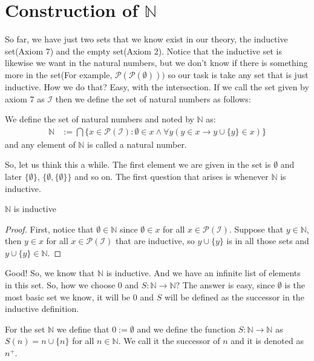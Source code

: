 \documentclass{tufte-handout}
\begin{document}
\section{Construction of $\mathbb{N}$}
So far, we have just two sets that we know exist in our theory, the inductive set(Axiom 7) and the empty set(Axiom 2). Notice that the inductive set is likewise we want in the natural numbers, but we don't know if there is something more in the set(For example, $\mathcal{P}(\mathcal{P}(\emptyset)))$ so our task is take any set that is just inductive. How we do that? Easy, with the intersection. If we call the set given by axiom 7 as $\mathcal{I}$ then we define the set of natural numbers as follows:
\begin{definition}
	We define the set of natural numbers and noted by $\mathbb{N}$ as:
	\begin{align*}
		\mathbb{N} &:= \bigcap \{x \in \mathcal{P}(\mathcal{I}): \emptyset \in x \wedge \forall y(y \in x \rightarrow y \cup \{y\} \in x)\}
	\end{align*}
	and any element of $\mathbb{N}$ is called a natural number.
\end{definition}

So, let us think this a while. The first element we are given in the set is $\emptyset$ and later $\{\emptyset\}$, $\{\emptyset, \{\emptyset\}\}$ and so on. The first question that arises is whenever $\mathbb{N}$ is inductive.
\begin{theorem}
	$\mathbb{N}$ is inductive
\end{theorem}
\begin{proof}
	First, notice that $\emptyset \in \mathbb{N}$ since $\emptyset \in x$ for all $x \in \mathcal{P}(\mathcal{I})$. Suppose that $y \in \mathbb{N}$, then $y \in x$ for all $x \in \mathcal{P}(\mathcal{I})$ that are inductive, so $y \cup \{y\}$ is in all those sets and $y \cup \{y\} \in \mathbb{N}$.
\end{proof}

Good! So, we know that $\mathbb{N}$ is inductive. And we have an infinite list of elements in this set. So, how we choose $0$ and $S: \mathbb{N} \to \mathbb{N}$? The answer is easy, since $\emptyset$ is the most basic set we know, it will be $0$ and $S$ will be defined as the successor in the inductive definition.
\begin{definition}
	For the set $\mathbb{N}$ we define that $0 := \emptyset$ and we define the function $S: \mathbb{N} \to \mathbb{N}$ as $S(n) = n \cup \{n\}$ for all $n \in \mathbb{N}$. We call it the successor of $n$ and it is denoted as $n^+$.
\end{definition}
\end{document}

